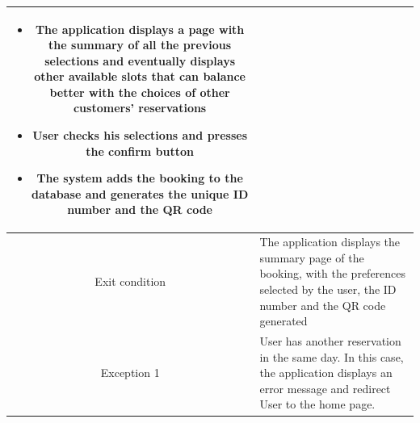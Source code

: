 \documentclass[table, 12pt]{article}
\begin{document}
\begin{longtable}{|c| p{10cm}|}
\begin{itemize}[nosep,after=\strut]
        \item The application displays a page with the summary of all the previous selections and eventually displays other available slots that can balance better with the choices of other customers' reservations
        \item User checks his selections and presses the confirm button
        \item The system adds the booking to the database and generates the unique ID number and the QR code
    \end{itemize}                                                                                                                   \\
    \hline
    Exit condition   & The application displays the summary page of the booking, with the preferences selected by the user, the ID number and the QR code generated
    \\
    \hline
    \hline
    Exception 1      & User has another reservation in the same day. In this case, the application displays an error message and redirect User to the home page.    \\
    \hline
\end{longtable}
\end{document}
